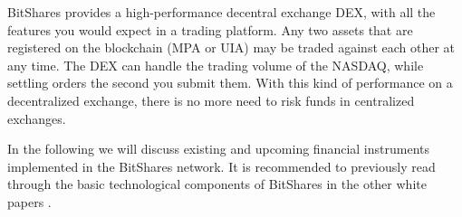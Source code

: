 BitShares provides a high-performance decentral exchange DEX, with all the
features you would expect in a trading platform. Any two assets that are
registered on the blockchain (MPA or UIA) may be traded against each other at
any time. The DEX can handle the trading volume of the NASDAQ, while settling
orders the second you submit them. With this kind of performance on a
decentralized exchange, there is no more need to risk funds in centralized
exchanges.


In the following we will discuss existing and upcoming financial instruments
implemented in the BitShares network. It is recommended to previously read
through the basic technological components of BitShares in the other white
papers \cite{}.

